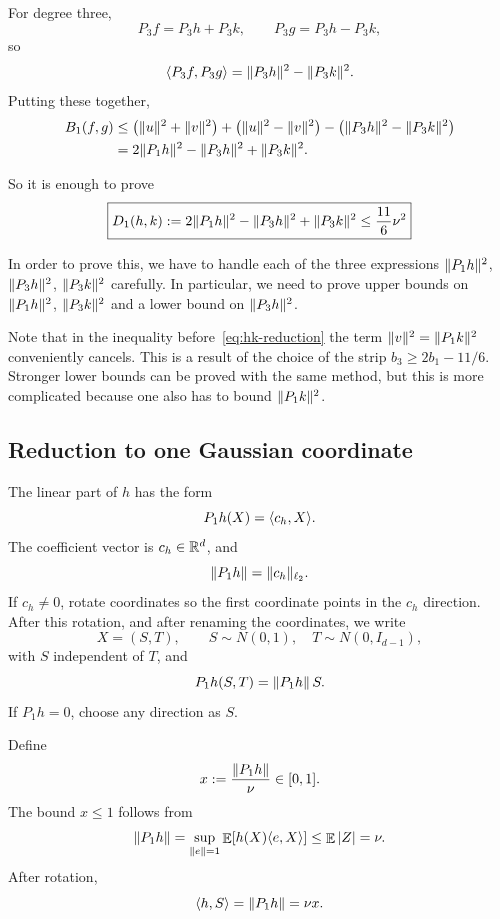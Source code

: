 For degree three,
\[
        P_3f=P_3h+P_3k,
        \qquad
        P_3g=P_3h-P_3k,
\]
so
\[
        \langle P_3f,P_3g\rangle=\lVert P_3h\rVert^2-\lVert P_3k\rVert^2.
\]
Putting these together,
\begin{align*}
        B_1(f,g)
        &\le
        \bigl(\lVert u\rVert^2+\lVert v\rVert^2\bigr)
        +\bigl(\lVert u\rVert^2-\lVert v\rVert^2\bigr)
        -\bigl(\lVert P_3h\rVert^2-\lVert P_3k\rVert^2\bigr)\\
        &=2\lVert P_1h\rVert^2-\lVert P_3h\rVert^2+\lVert P_3k\rVert^2.
\end{align*}

So it is enough to prove
\begin{equation}
\boxed{\displaystyle
        D_1(h,k):=2\lVert P_1h\rVert^2-\lVert P_3h\rVert^2+\lVert P_3k\rVert^2
        \le \frac{11}{6}\nu^2
}
\label{eq:hk-reduction}
\end{equation}

In order to prove this, we have to handle each of the three expressions $\lVert P_1h\rVert^2$, $\lVert P_3h\rVert^2$, $\lVert P_3k\rVert^2$ carefully. In particular, we need to prove upper bounds on $\lVert P_1h\rVert^2$, $\lVert P_3k\rVert^2$ and a lower bound on $\lVert P_3h\rVert^2$.

\begin{remark}
    Note that in the inequality before~\eqref{eq:hk-reduction} the term $\lVert v\rVert^2=\lVert P_1k\rVert^2$ conveniently cancels. This is a result of the choice of the strip $b_3\ge 2b_1-11/6$. Stronger lower bounds can be proved with the same method, but this is more complicated because one also has to bound $\lVert P_1k\rVert^2$.
\end{remark}

\subsection{Reduction to one Gaussian coordinate}
\label{sec:rotation}

The linear part of $h$ has the form
\[
        P_1h(X)=\langle c_h,X\rangle.
\]
The coefficient vector is $c_h\in\mathbb{R}^d$, and
\[
        \lVert P_1h\rVert=\lVert c_h\rVert_{\ell_2}.
\]
If $c_h\neq0$, rotate coordinates so the first coordinate points in the $c_h$ direction. After this rotation, and after renaming the coordinates, we write
\[
        X=(S,T),
        \qquad S\sim N(0,1),\quad T\sim N(0,I_{d-1}),
\]
with $S$ independent of $T$, and
\[
        P_1h(S,T)=\lVert P_1h\rVert\,S.
\]
If $P_1h=0$, choose any direction as $S$.

Define
\[
        x:=\frac{\lVert P_1h\rVert}{\nu}\in[0,1].
\]
The bound $x\le1$ follows from
\[
        \lVert P_1h\rVert=\sup_{\lVert e\rVert=1}\mathop{\mathbb{E}}[h(X)\langle e,X\rangle]
        \le \mathop{\mathbb{E}}|Z|=\nu.
\]
After rotation,
\[
        \langle h,S\rangle=\lVert P_1h\rVert=\nu x.
\]

